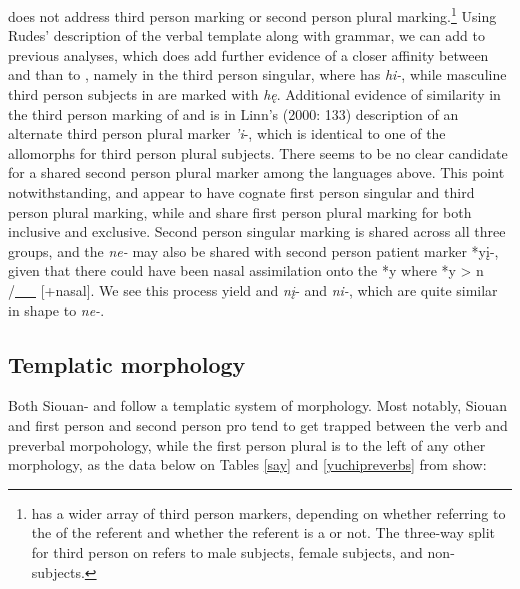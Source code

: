 \documentclass[output=paper]{LSP/langsci}
\begin{document}
\citet{Rankin1998scy} does not address third person marking or second person plural marking.\footnote{ has a wider array of third person markers, depending on whether referring to the  of the referent and whether the referent is a  or not. The three-way split for third person on  refers to male  subjects, female  subjects, and non- subjects.} Using Rudes' \citeyear{Rudes2007} description of the  verbal template along with   grammar, we can add to previous analyses, which does add further evidence of a closer affinity between  and  than to , namely in the third person singular, where  has \emph{hi-}, while masculine third person subjects in  are marked with \emph{h\k{e}}. Additional evidence of similarity in the third person marking of  and  is in Linn's (2000: 133) description of an alternate third person plural marker \emph{'i}-, which is identical to one of the  allomorphs for third person plural subjects. There seems to be no clear candidate for a shared second person plural marker among the languages above. This point notwithstanding,  and  appear to have cognate first person singular and third person plural marking, while  and  share first person plural marking for both inclusive and exclusive. Second person singular marking is shared across all three groups, and the  \emph{ne-} may also be shared with  second person patient marker *y\k{i}-, given that there could have been nasal assimilation onto the *y where *y > n /\underline{~~~} [+nasal]. We see this process yield  and  \emph{n\k{i}}- and  \emph{ni-}, which are quite similar in shape to  \emph{ne-}.

\subsection{Templatic morphology}

Both Siouan- and  follow a templatic system of morphology. Most notably, Siouan and  first person and second person pro tend to get trapped between the verb and preverbal morpohology, while the first person plural is to the left of any other morphology, as the data below on Tables \ref{say} and \ref{yuchipreverbs} from \citet{Rankin1998scy} show:
\end{document}
